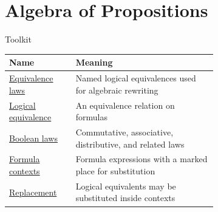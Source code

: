 \section{Algebra of Propositions}

\begin{toolkitbox}{Toolkit}
\small
\begin{tabular}{l p{0.68\linewidth}}
\toprule
\textbf{Name} & \textbf{Meaning} \\
\midrule
\hyperref[def:propositional-equivalence-law]{Equivalence laws} & Named logical equivalences used for algebraic rewriting \\
\hyperref[thm:logical-equivalence-equivalence-relation]{Logical equivalence} & An equivalence relation on formulas \\
\hyperref[thm:basic-boolean-equivalence-laws-propositional-logic]{Boolean laws} & Commutative, associative, distributive, and related laws \\
\hyperref[def:formula-context-propositional-logic]{Formula contexts} & Formula expressions with a marked place for substitution \\
\hyperref[thm:replacement-of-logical-equivalents-propositional-logic]{Replacement} & Logical equivalents may be substituted inside contexts \\
\bottomrule
\end{tabular}
\end{toolkitbox}




